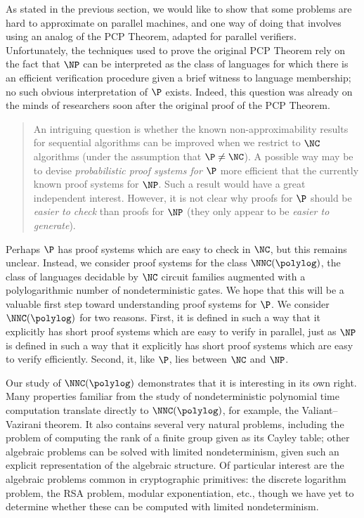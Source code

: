 \documentclass{article}
\begin{document}
As stated in the previous section, we would like to show that some problems are hard to approximate on parallel machines, and one way of doing that involves using an analog of the PCP Theorem, adapted for parallel verifiers.
Unfortunately, the techniques used to prove the original PCP Theorem rely on the fact that $\NP$ can be interpreted as the class of languages for which there is an efficient verification procedure given a brief witness to language membership; no such obvious interpretation of $\P$ exists.
Indeed, this question was already on the minds of researchers soon after the original proof of the PCP Theorem.
\blockquote[{\autocite{trevisan98}}]{
  An intriguing question is whether the known non-approximability results for sequential algorithms can be improved when we restrict to $\NC$ algorithms (under the assumption that $\P \neq \NC$).
  A possible way may be to devise \emph{probabilistic proof systems for $\P$} more efficient that the currently known proof systems for $\NP$.
  Such a result would have a great independent interest.
  However, it is not clear why proofs for $\P$ should be \emph{easier to check} than proofs for $\NP$ (they only appear to be \emph{easier to generate}).
}
Perhaps $\P$ has proof systems which are easy to check in $\NC$, but this remains unclear.
Instead, we consider proof systems for the class $\NNC(\polylog)$, the class of languages decidable by $\NC$ circuit families augmented with a polylogarithmic number of nondeterministic gates.
We hope that this will be a valuable first step toward understanding proof systems for $\P$.
We consider $\NNC(\polylog)$ for two reasons.
First, it is defined in such a way that it explicitly has short proof systems which are easy to verify in parallel, just as $\NP$ is defined in such a way that it explicitly has short proof systems which are easy to verify efficiently.
Second, it, like $\P$, lies between $\NC$ and $\NP$.

Our study of $\NNC(\polylog)$ demonstrates that it is interesting in its own right.
Many properties familiar from the study of nondeterministic polynomial time computation translate directly to $\NNC(\polylog)$, for example, the Valiant--Vazirani theorem. %
It also contains several very natural problems, including the problem of computing the rank of a finite group given as its Cayley table; other algebraic problems can be solved with limited nondeterminism, given such an explicit representation of the algebraic structure.
Of particular interest are the algebraic problems common in cryptographic primitives: the discrete logarithm problem, the RSA problem, modular exponentiation, etc., though we have yet to determine whether these can be computed with limited nondeterminism. %
\end{document}
